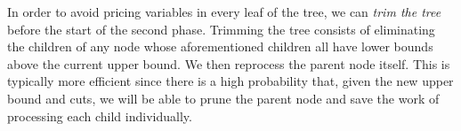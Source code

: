 In order to avoid pricing variables in every leaf of the tree, we can
{\em trim the tree} before the start of the second phase. Trimming the
tree consists of eliminating the children of any node whose
aforementioned children all have lower bounds above the current upper
bound. We then reprocess the parent node itself. This is typically
more efficient since there is a high probability that, given the new
upper bound and cuts, we will be able to prune the parent node and
save the work of processing each child individually.




